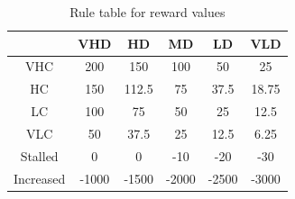 \documentclass[acmsmall]{acmart}
\begin{document}
\begin{table}[h]
\begin{tabular}{c|ccccc}
\toprule
          & VHD   & HD    & MD    & LD    & VLD   \\
\midrule
VHC       & 200   & 150   & 100   & 50    & 25    \\
HC        & 150   & 112.5 & 75    & 37.5  & 18.75 \\
LC        & 100   & 75    & 50    & 25    & 12.5  \\
VLC       & 50    & 37.5  & 25    & 12.5  & 6.25  \\
Stalled   & 0     & 0     & -10   & -20   & -30   \\
Increased & -1000 & -1500 & -2000 & -2500 & -3000 \\
\bottomrule
\end{tabular}
\caption{Rule table for reward values \label{tab:rules}}
\end{table}
\end{document}
